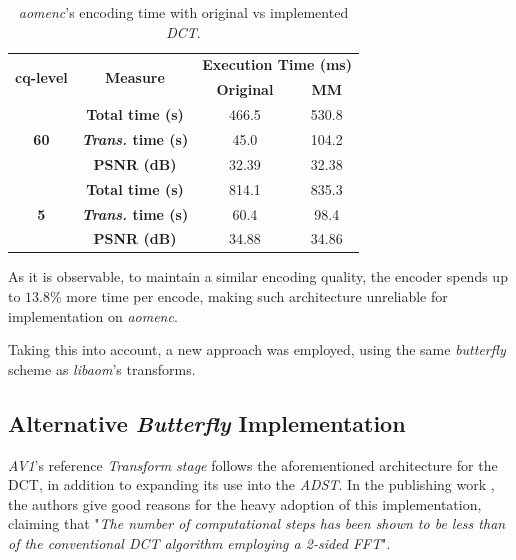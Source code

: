 \begin{table}[!htpb]
    \centering
    \begin{tabular}{cccc} \toprule
        \multirow{2}{*}{\textbf{cq-level}} & \multirow{2}{*}{\textbf{Measure}} &    \multicolumn{2}{c}{\textbf{Execution Time (ms)}} \\
        &   &   \textbf{Original} &      \textbf{MM} \\ \toprule
         \multirow{3}{*}{\textbf{60}}   & \textbf{Total time (s)}       & 466.5     & 530.8 \\
                                        & \textbf{\emph{Trans.} time (s)}    & 45.0      & 104.2 \\
                                        & \textbf{PSNR (dB)}            & 32.39     & 32.38 \\ \hline
         \multirow{3}{*}{\textbf{5}}    & \textbf{Total time (s)}       & 814.1     & 835.3 \\
                                        & \textbf{\emph{Trans.} time (s)}    & 60.4      & 98.4 \\
                                        & \textbf{PSNR (dB)}            & 34.88     & 34.86 \\                                        
         \bottomrule
    \end{tabular}
    \caption{\emph{aomenc}'s encoding time with original vs implemented \emph{DCT}.}
    \label{tab:multresults}
\end{table}

As it is observable, to maintain a similar encoding quality, the encoder spends up to $13.8\%$ more time per encode, making such architecture unreliable for implementation on \emph{aomenc}.

Taking this into account, a new approach was employed, using the same \emph{butterfly} scheme as \emph{libaom}'s transforms.

\subsection{Alternative \emph{Butterfly} Implementation}

\emph{AV1}'s reference \emph{Transform stage} follows the aforementioned architecture for the DCT, in addition to expanding its use into the \emph{ADST}. In the publishing work \cite{wen-hsiungchenFastComputationalAlgorithm1977}, the authors give good reasons for the heavy adoption of this implementation, claiming that "\emph{The number of computational steps has been shown to be less than  of the conventional DCT algorithm employing a 2-sided FFT}". 

